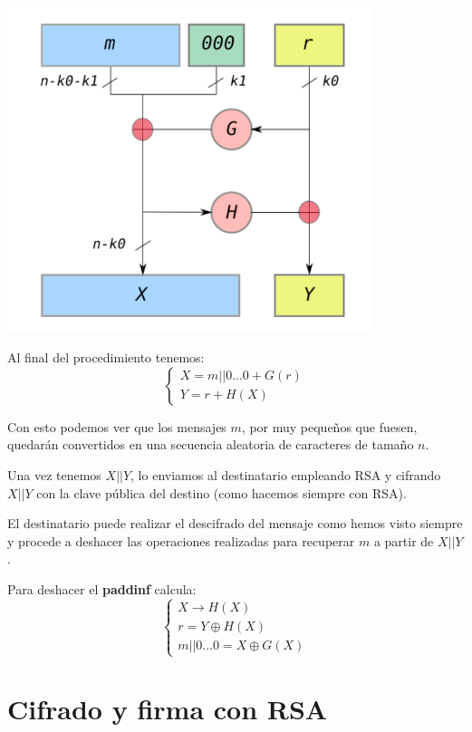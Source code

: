 \begin{center}

\includegraphics[width=0.8\textwidth]{img/Oaep-diagram-20080305.png}

Al final del procedimiento tenemos:
\[\left\{\begin{array}{l} X = m||0...0 + G(r) \\ Y=r+H(X)\end{array}\right.\]

\end{center}

Con esto podemos ver que los mensajes $m$, por muy pequeños que fuesen, quedarán convertidos en una secuencia aleatoria de caracteres de tamaño $n$.

Una vez tenemos $X||Y$, lo enviamos al destinatario empleando RSA y cifrando $X||Y$ con la clave pública del destino (como hacemos siempre con RSA).

El destinatario puede realizar el descifrado del mensaje como hemos visto siempre y procede a deshacer las operaciones realizadas para recuperar $m$ a partir de $X||Y$.

Para deshacer el \textbf{paddinf} calcula:
\[\left\{ \begin{array}{l} X \to H(X) \\
r=Y\oplus H(X) \\
m||0...0 = X\oplus G(X)\end{array}\right.\]

\section{Cifrado y firma con RSA}

